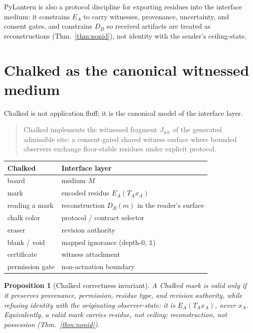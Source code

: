 \documentclass[11pt]{article}
\newtheorem{proposition}{Proposition}
\theoremstyle{definition}
\theoremstyle{remark}
\newcommand{\Jwit}{J_{\mathrm{wit}}}
\begin{document}
PyLantern is also a protocol discipline for exporting residues into the interface medium: it
constrains $E_A$ to carry witnesses, provenance, uncertainty, and consent gates, and constrains $D_B$
so received artifacts are treated as reconstructions (Thm.~\ref{thm:nonid}), not identity with the
sender's ceiling-state.

\section{Chalked as the canonical witnessed medium}\label{sec:chalked}

Chalked is not application fluff; it is the canonical model of the interface layer.

\begin{quote}
Chalked implements the witnessed fragment $\Jwit$ of the generated admissible site: a consent-gated
shared witness surface where bounded observers exchange floor-stable residues under explicit protocol.
\end{quote}

\begin{center}
\renewcommand{\arraystretch}{1.2}
\begin{tabular}{@{}p{} p{}@{}}
\toprule
\textbf{Chalked} & \textbf{Interface layer} \\
\midrule
board & medium $M$ \\
mark & encoded residue $E_A(T_Ax_A)$ \\
reading a mark & reconstruction $D_B(m)$ in the reader's surface \\
chalk color & protocol / contract selector \\
eraser & revision authority \\
blank / void & mapped ignorance (depth-$0$, $\mathbb{1}$) \\
certificate & witness attachment \\
permission gate & non-actuation boundary \\
\bottomrule
\end{tabular}
\end{center}

\begin{proposition}[Chalked correctness invariant]\label{prop:chalked}
A Chalked mark is valid only if it preserves provenance, permission, residue type, and revision
authority, while refusing identity with the originating observer-state: it is $E_A(T_Ax_A)$, never
$x_A$. Equivalently, \emph{a valid mark carries residue, not ceiling; reconstruction, not possession}
(Thm.~\ref{thm:nonid}).
\end{proposition}
\end{document}
